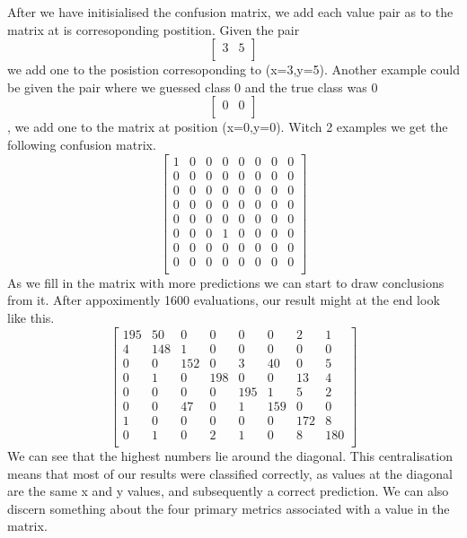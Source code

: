 After we have initisialised the confusion matrix, we add each value pair as to the matrix at is corresoponding postition.  Given the pair \[\begin{bmatrix}
 3 & 5\\ 
\end{bmatrix}\]
we add one to the posistion corresoponding to (x=3,y=5).  Another example could be given the pair where we guessed class 0 and the true class was 0 \[\begin{bmatrix}
 0 & 0\\ 
\end{bmatrix}\], we add one to the matrix at position (x=0,y=0). Witch 2 examples we get the following confusion matrix.
\[
\begin{bmatrix}
 1 & 0 &  0 &  0 &  0 &  0 &  0 &  0\\
 0 & 0 &  0 &  0 &  0 &  0 &  0 &  0\\
 0 & 0 &  0 &  0 &  0 &  0 &  0 &  0\\
 0 & 0 &  0 &  0 &  0 &  0 &  0 &  0\\
 0 & 0 &  0 &  0 &  0 &  0 &  0 &  0\\
 0 & 0 &  0 &  1 &  0 &  0 &  0 &  0\\
 0 & 0 &  0 &  0 &  0 &  0 &  0 &  0\\
 0 & 0 &  0 &  0 &  0 &  0 &  0 &  0\\
\end{bmatrix}
\]
As we fill in the matrix with more predictions we can start to draw conclusions from it. After appoximently 1600 evaluations, our result might at the end look like this.
\[
\begin{bmatrix}
 195 & 50 &  0 &  0 &  0 &  0 &  2  & 1\\
   4 & 148&  1 &  0 &  0 &  0 &  0  & 0\\
   0 &  0 & 152&  0 &  3 & 40 &  0  & 5\\
   0 &  1 &  0 &198 &  0 &  0 & 13  & 4\\
   0 &  0 &  0 & 0  &195 &  1 &  5  & 2\\
   0 &  0 & 47 & 0  &  1 &159 &  0  & 0\\
   1 &  0 &  0 & 0  &  0 &  0 & 172 &  8\\
   0 &  1 &  0 & 2  &  1 &  0 &  8  & 180\\
\end{bmatrix}
\]
We can see that the highest numbers lie around the diagonal. This centralisation means that most of our results were classified correctly, as values at the diagonal are the same x and y values, and subsequently a correct prediction. 
We can also discern something about the four primary metrics associated with a value in the matrix.\\

